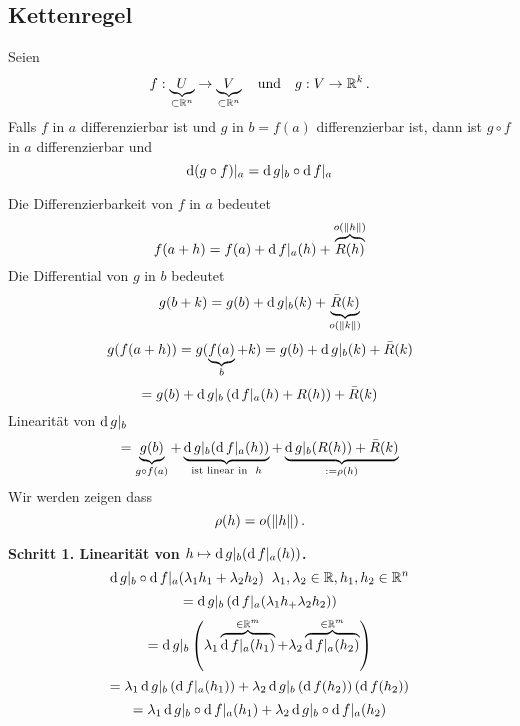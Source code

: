 \subsection{Kettenregel}
\begin{Sat} Seien
\[f:\underbrace{U}_{\subset \mathbb{R}^n}\rightarrow\underbrace{V}_{\subset \mathbb{R}^n}
\quad \mbox{und}\quad g:V\rightarrow\mathbb{R}^k\, .\]
  Falls $f$ in $a$ differenzierbar ist und $g$ in $b=f(a)$ differenzierbar ist, dann ist $g\circ f$ in $a$ differenzierbar und
  \begin{equation}
    \label{e:1104111}
    \operatorname{d}(g\circ f)|_{a} = \operatorname{d} g|_b\circ\operatorname{d} f|_a
  \end{equation}
\end{Sat}
\begin{Bew}
  Die Differenzierbarkeit von $f$ in $a$ bedeutet
  \[f(a+h)=f(a)+\operatorname{d} f|_a(h) +\overbrace{R(h)}^{o(\left\| h \right\|)}\]
  Die Differential von $g$ in $b$ bedeutet
  \[g(b+k)=g(b)+\operatorname{d} g|_b(k) +\underbrace{\bar R(k)}_{o(\left\| k \right\|)}\]
  \[g(f(a+h))=g(\underbrace{f(a)}_b+k)=g(b)+\operatorname{d} g|_b (k)+\bar R(k)\]
  \[=g(b)+\operatorname{d} g|_b\left( \operatorname{d} f|_a(h)+R(h) \right)+\bar R(k)\]
Linearität von $\operatorname{d} g|_b$
  \[=\underbrace{g(b)}_{g\circ f(a)}+\underbrace{\operatorname{d} g|_b(\operatorname{d} f|_a(h))}_{\text{ist linear in}\hspace{2mm} h}+\underbrace{\operatorname{d} g|_b(R(h))+\bar R(k)}_{:=\rho(h)}\]
Wir werden zeigen dass  
\[\rho(h)=o(\left\| h \right\|)\, .\]

\medskip

{\bf Schritt 1.  Linearität von $h\mapsto \operatorname{d} g|_b(\operatorname{d} f|_a(h))$.}
  \[\operatorname{d} g|_b\circ\operatorname{d} f|_a(\lambda_1h_1+\lambda_2h_2)\hspace{2mm}\lambda_1,\lambda_2\in\mathbb{R}, h_1,h_2\in\mathbb{R}^n\]
  \[=\operatorname{d} g|_b\left( \operatorname{d} f|_a(\lambda_1h_+\lambda_2h_2 \right))\]
  \[=\operatorname{d} g|_b\left( \lambda_1\overbrace{\operatorname{d} f|_a(h_1)}^{\in\mathbb{R}^m}+\lambda_2\overbrace{\operatorname{d} f|_a(h_2)}^{\in\mathbb{R}^m} \right)\]
  \[=\lambda_1\operatorname{d} g|_b\left( \operatorname{d} f|_a(h_1) \right)+\lambda_2\operatorname{d} g|_b\left( \operatorname{d} f(h_2) \right)\left( \operatorname{d} f(h_2) \right)\]
  \[=\lambda_1\operatorname{d} g|_b\circ \operatorname{d} f|_a(h_1)+\lambda_2\operatorname{d} g|_b\circ \operatorname{d} f|_a(h_2)\]


\end{Bew}
